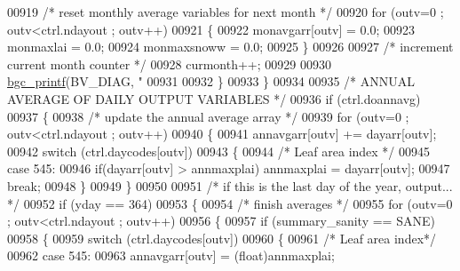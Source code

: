 \begin{DoxyCode}
{{{{{{{{{{{{{{{{{{{{{{{{{{{{{{{{{{{{{{{{{{00919                     \textcolor{comment}{/* reset monthly average variables for next month */}
00920                     \textcolor{keywordflow}{for} (outv=0 ; outv<ctrl.ndayout ; outv++)
00921                     \{
00922                         monavgarr[outv] = 0.0;
00923                         monmaxlai = 0.0;
00924                         monmaxsnoww = 0.0;
00925                     \}
00926                     
00927                     \textcolor{comment}{/* increment current month counter */}
00928                     curmonth++;
00929                     
00930                     \hyperlink{bgc__io_8c_af287cce6e2aede1ce337de9319e80d0d}{bgc\_printf}(BV\_DIAG, \textcolor{stringliteral}{"%
00931                 
00932                 \}
00933             \}
00934             
00935             \textcolor{comment}{/* ANNUAL AVERAGE OF DAILY OUTPUT VARIABLES */}
00936             \textcolor{keywordflow}{if} (ctrl.doannavg)
00937             \{
00938                 \textcolor{comment}{/* update the annual average array */}
00939                 \textcolor{keywordflow}{for} (outv=0 ; outv<ctrl.ndayout ; outv++)
00940                 \{
00941                     annavgarr[outv] += dayarr[outv];
00942                     \textcolor{keywordflow}{switch} (ctrl.daycodes[outv])
00943                     \{
00944                         \textcolor{comment}{/* Leaf area index */}
00945                         \textcolor{keywordflow}{case} 545:
00946                             \textcolor{keywordflow}{if}(dayarr[outv] > annmaxplai) annmaxplai = dayarr[outv];
00947                             \textcolor{keywordflow}{break};
00948                     \}
00949                 \}
00950                 
00951                 \textcolor{comment}{/* if this is the last day of the year, output... */}
00952                 \textcolor{keywordflow}{if} (yday == 364)
00953                 \{
00954                     \textcolor{comment}{/* finish averages */}
00955                     \textcolor{keywordflow}{for} (outv=0 ; outv<ctrl.ndayout ; outv++)
00956                     \{
00957                         \textcolor{keywordflow}{if} (summary\_sanity == SANE)
00958                         \{
00959                             \textcolor{keywordflow}{switch} (ctrl.daycodes[outv])
00960                             \{
00961                                 \textcolor{comment}{/* Leaf area index*/} 
00962                                 \textcolor{keywordflow}{case} 545:
00963                                     annavgarr[outv] = (float)annmaxplai;
}}}}}}}}}}}}}}}}}}}}}}}}}}}}}}}}}}}}}}}}}}}
\end{DoxyCode}
